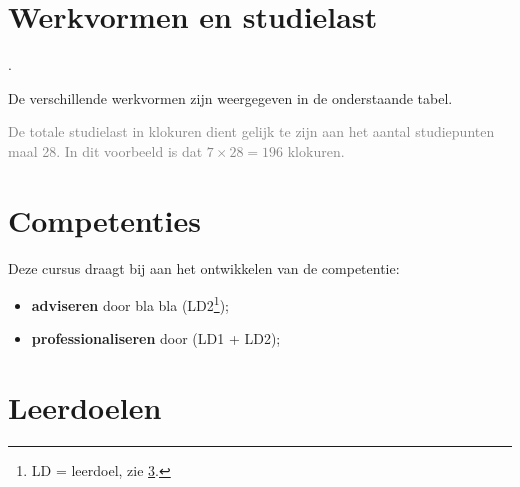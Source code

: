 \section{Werkvormen en studielast}
\label{sec:werkvormen}
\Bla{} .

De verschillende werkvormen zijn weergegeven in de onderstaande tabel.


\textcolor{gray}{De totale studielast in klokuren dient gelijk te zijn aan het aantal studiepunten maal 28. In dit voorbeeld is dat $7\times{}28 = 196$ klokuren.}

\iftoggle{ebook}{\needspace{5cm}}{}
\section{Competenties}
\label{sec:competenties}
Deze cursus draagt bij aan het ontwikkelen van de competentie:
\begin{itemize}
	\item \textbf{adviseren} door bla bla (LD2\footnote{%
		LD = leerdoel, zie \cref{sec:leerdoelen}.
	});
	\item \textbf{professionaliseren} door \bla{} \bla{} (LD1 + LD2);
\end{itemize}

\section{Leerdoelen}
\label{sec:leerdoelen}

